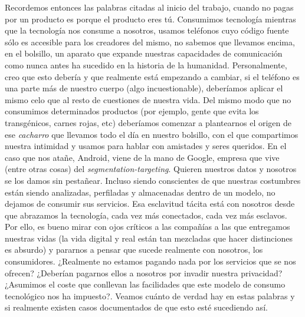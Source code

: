 \documentclass[12pt,a4paper,oneside]{book} %
\begin{document}
\newline \newline
Recordemos entonces las palabras citadas al inicio del trabajo, cuando no pagas por un producto es porque el producto eres tú. Consumimos tecnología mientras que la tecnología nos consume a nosotros, usamos teléfonos cuyo código fuente sólo es accesible para los creadores del mismo, no sabemos que llevamos encima, en el bolsillo, un aparato que expande nuestras capacidades de comunicación como nunca antes ha sucedido en la historia de la humanidad. 
\newline \newline
Personalmente, creo que esto debería y que realmente está empezando a cambiar, si el teléfono es una parte más de nuestro cuerpo (algo incuestionable), deberíamos aplicar el mismo celo que al resto de cuestiones de nuestra vida. Del mismo modo que no consumimos determinados productos (por ejemplo, gente que evita los transgénicos, carnes rojas, etc) deberíamos comenzar a plantearnos el origen de ese \textit{cacharro} que llevamos todo el día en nuestro bolsillo, con el que compartimos nuestra intimidad y usamos para hablar con amistades y seres queridos. 
\newline \newline
En el caso que nos atañe, Android, viene de la mano de Google, empresa que vive (entre otras cosas) del \textit{segmentation-targeting}. Quieren nuestros datos y nosotros se los damos sin pestañear. Incluso siendo conscientes de que nuestras costumbres están siendo analizadas, perfiladas y almacenadas dentro de un modelo, no dejamos de consumir sus servicios. 
\newline \newline
Esa esclavitud tácita está con nosotros desde que abrazamos la tecnología, cada vez más conectados, cada vez más esclavos. Por ello, es bueno mirar con ojos críticos a las compañías a las que entregamos nuestras vidas (la vida digital y real están tan mezcladas que hacer distinciones es absurdo) y pararnos a pensar que sucede realmente con nosotros, los consumidores. ¿Realmente no estamos pagando nada por los servicios que se nos ofrecen? ¿Deberían pagarnos ellos a nosotros por invadir nuestra privacidad? ¿Asumimos el coste que conllevan las facilidades que este modelo de consumo tecnológico nos ha impuesto?. 
\newline \newline
Veamos cuánto de verdad hay en estas palabras y si realmente existen casos documentados de que esto esté sucediendo así. 
\end{document}
